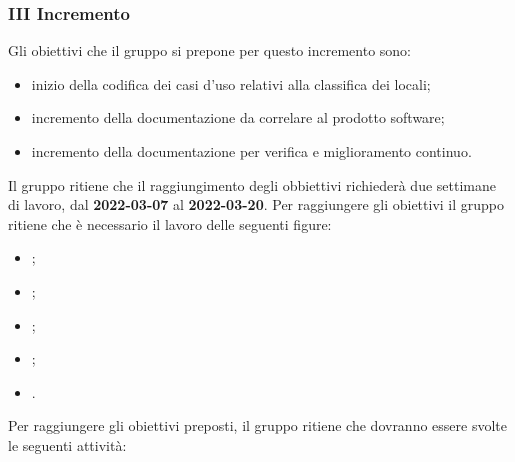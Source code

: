 \pagebreak

\subsubsection{III Incremento}
Gli obiettivi che il gruppo si prepone per questo incremento sono:
\begin{itemize}
	\item inizio della codifica dei casi d'uso relativi alla classifica dei locali;
 	\item incremento della documentazione da correlare al prodotto software;
	\item incremento della documentazione per verifica e miglioramento continuo.
\end{itemize}
Il gruppo ritiene che il raggiungimento degli obbiettivi richiederà due settimane di lavoro, dal \textbf{2022-03-07} al \textbf{2022-03-20}.
Per raggiungere gli obiettivi il gruppo ritiene che è necessario il lavoro delle seguenti figure:
\begin{itemize}
	\item \RE{};
 	\item \AM{};
   	\item \PT{};
    \item \PR{};
   	\item \VE{}.
\end{itemize}
Per raggiungere gli obiettivi preposti, il gruppo ritiene che dovranno essere svolte le seguenti attività:
